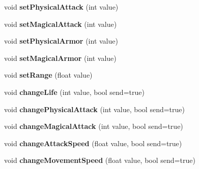 \begin{DoxyCompactItemize}
\item 
\hypertarget{class_player_stat_a6b974d8fb4a09a1916b601c7da5ce36f}{void {\bfseries set\-Physical\-Attack} (int value)}\label{class_player_stat_a6b974d8fb4a09a1916b601c7da5ce36f}

\item 
\hypertarget{class_player_stat_afe503d0be60676279c28e0393bab4724}{void {\bfseries set\-Magical\-Attack} (int value)}\label{class_player_stat_afe503d0be60676279c28e0393bab4724}

\item 
\hypertarget{class_player_stat_a39828d0394b3b5c257468ae2606355dc}{void {\bfseries set\-Physical\-Armor} (int value)}\label{class_player_stat_a39828d0394b3b5c257468ae2606355dc}

\item 
\hypertarget{class_player_stat_aa5401222eb9266caa3c96afd2387dd9b}{void {\bfseries set\-Magical\-Armor} (int value)}\label{class_player_stat_aa5401222eb9266caa3c96afd2387dd9b}

\item 
\hypertarget{class_player_stat_a264328e8f78c17401f1bbae2ab7b954e}{void {\bfseries set\-Range} (float value)}\label{class_player_stat_a264328e8f78c17401f1bbae2ab7b954e}

\item 
\hypertarget{class_player_stat_afb131df002ef86c158c8029feb3ddd08}{void {\bfseries change\-Life} (int value, bool send=true)}\label{class_player_stat_afb131df002ef86c158c8029feb3ddd08}

\item 
\hypertarget{class_player_stat_a9a769a4ab9f42b638c97022336a5c6b7}{void {\bfseries change\-Physical\-Attack} (int value, bool send=true)}\label{class_player_stat_a9a769a4ab9f42b638c97022336a5c6b7}

\item 
\hypertarget{class_player_stat_aa227b94bcc621db872aa92ed1bd42819}{void {\bfseries change\-Magical\-Attack} (int value, bool send=true)}\label{class_player_stat_aa227b94bcc621db872aa92ed1bd42819}

\item 
\hypertarget{class_player_stat_a0e5271ba0fbf8d064227e19ff4618798}{void {\bfseries change\-Attack\-Speed} (float value, bool send=true)}\label{class_player_stat_a0e5271ba0fbf8d064227e19ff4618798}

\item 
\hypertarget{class_player_stat_afb43ae5dec2ed7c76dc1806b6bf8360d}{void {\bfseries change\-Movement\-Speed} (float value, bool send=true)}\label{class_player_stat_afb43ae5dec2ed7c76dc1806b6bf8360d}


\end{DoxyCompactItemize}
